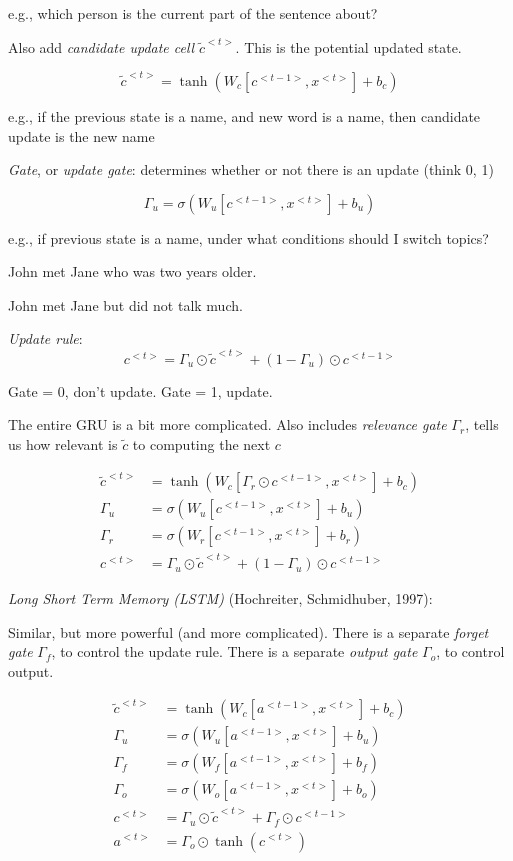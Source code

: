 \documentclass[english]{article}
\begin{document}
e.g., which person is the current part of the sentence about?


Also add \emph{candidate update cell} $\tilde c^{<t>}$. This is the potential updated state. 

$$\tilde c^{<t>} = \tanh(W_c [c^{<t-1>},x^{<t>}]+b_c)$$

e.g., if the previous state is a name, and new word is a name, then candidate update is the new name

\emph{Gate}, or \emph{update gate}: determines whether or not there is an update (think 0, 1)

$$\Gamma_u = \sigma(W_u [c^{<t-1>},x^{<t>}]+b_u)$$

e.g., if previous state is a name, under what conditions should I switch topics? 

\benum 
\item John met Jane who was two years older. 
\item John met Jane but did not talk much.
\eenum 



\emph{Update rule}: 
$$c^{<t>} = \Gamma_u \odot \tilde c^{<t>} + (1-\Gamma_u) \odot c^{<t-1>}$$

Gate = 0, don't update. Gate = 1, update.

The entire GRU is a bit more complicated. Also includes \emph{relevance gate} $\Gamma_r$, tells us how relevant is $\tilde c$ to computing the next $c$ 

\begin{align*}
\tilde c^{<t>} &= \tanh(W_c [\Gamma_r  \odot c^{<t-1>},x^{<t>}]+b_c)\\
\Gamma_u &= \sigma(W_u [c^{<t-1>},x^{<t>}]+b_u)\\
\Gamma_r &= \sigma(W_r [c^{<t-1>},x^{<t>}]+b_r)\\
c^{<t>} & = \Gamma_u \odot \tilde c^{<t>} + (1-\Gamma_u) \odot c^{<t-1>}
\end{align*}


\item \emph{Long Short Term Memory (LSTM)} (Hochreiter, Schmidhuber, 1997): 

Similar, but more powerful (and more complicated). There is a separate \emph{forget gate} $\Gamma_f$, to control the update rule. There is a separate \emph{output gate}  $\Gamma_o$, to control output. 

\begin{align*}
\tilde c^{<t>} &= \tanh(W_c [a^{<t-1>},x^{<t>}]+b_c)\\
\Gamma_u &= \sigma(W_u [a^{<t-1>},x^{<t>}]+b_u)\\
\Gamma_f &= \sigma(W_f [a^{<t-1>},x^{<t>}]+b_f)\\
\Gamma_o &= \sigma(W_o [a^{<t-1>},x^{<t>}]+b_o)\\
c^{<t>} & = \Gamma_u \odot \tilde c^{<t>} + \Gamma_f \odot c^{<t-1>}\\
a^{<t>} & = \Gamma_o \odot \tanh(c^{<t>})
\end{align*}
\end{document}
